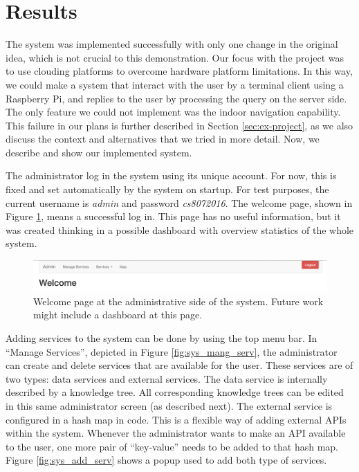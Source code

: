 \section{Results}

The system was implemented successfully with only one change in the original idea, which is not crucial to this demonstration.
Our focus with the project was to use clouding platforms to overcome hardware platform limitations.
In this way, we could make a system that interact with the user by a terminal client using a Raspberry Pi, and replies to the user by processing the query on the server side.
The only feature we could not implement was the indoor navigation capability.
This failure in our plans is further described in Section \ref{sec:ex-project}, as we also discuss the context and alternatives that we tried in more detail.
Now, we describe and show our implemented system.

The administrator log in the system using its unique account.
For now, this is fixed and set automatically by the system on startup.
For test purposes, the current username is \emph{admin} and password \emph{cs8072016}.
The welcome page, shown in Figure \ref{fig:sys_welcome}, means a successful log in.
This page has no useful information, but it was created thinking in a possible dashboard with overview statistics of the whole system.

\begin{figure}[htbp]
\begin{center}
\includegraphics[width=\textwidth]{figures/welcome.png}
\caption{Welcome page at the administrative side of the system. Future work might include a dashboard at this page.}
\label{fig:sys_welcome}
\end{center}
\end{figure}

Adding services to the system can be done by using the top menu bar.
In ``Manage Services'', depicted in Figure \ref{fig:sys_mang_serv}, the administrator can create and delete services that are available for the user.
These services are of two types: data services and external services.
The data service is internally described by a knowledge tree.
All corresponding knowledge trees can be edited in this same administrator screen (as described next).
The external service is configured in a hash map in code.
This is a flexible way of adding external APIs within the system.
Whenever the administrator wants to make an API available to the user, one more pair of ``key-value'' needs to be added to that hash map.
Figure \ref{fig:sys_add_serv} shows a popup used to add both type of services.

